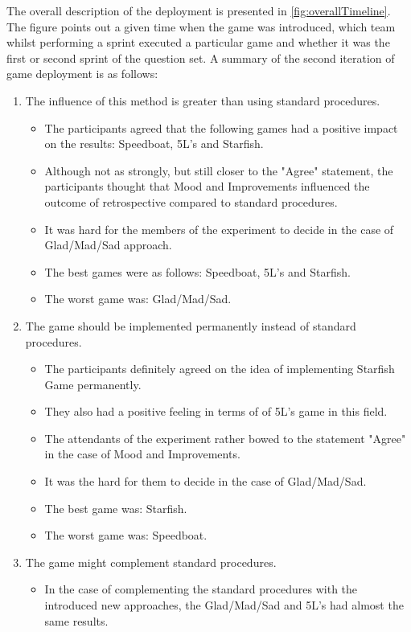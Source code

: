 The overall description of the deployment is presented in \autoref{fig:overallTimeline}. The figure points out a given time when the game was introduced, which team whilst performing a sprint executed a particular game and whether it was the first or second sprint of the question set. A summary of the second iteration of game deployment is as follows:
\begin{enumerate}
    \item The influence of this method is greater than using standard procedures.
    \begin{itemize}
        \item The participants agreed that the following games had a positive impact on the results: Speedboat, 5L's and Starfish.
        \item Although not as strongly, but still closer to the "Agree" statement, the participants thought that Mood and Improvements influenced the outcome of retrospective compared to standard procedures.
        \item It was hard for the members of the experiment to decide in the case of Glad/Mad/Sad approach.
        \item The best games were as follows: Speedboat, 5L's and Starfish.
        \item The worst game was: Glad/Mad/Sad.
    \end{itemize}
    \item The game should be implemented permanently instead of standard procedures.
    \begin{itemize}
        \item The participants definitely agreed on the idea of implementing Starfish Game permanently.
        \item They also had a positive feeling in terms of of 5L's game in this field.
        \item The attendants of the experiment rather bowed to the statement "Agree" in the case of Mood and Improvements.
        \item It was the hard for them to decide in the case of Glad/Mad/Sad.
        \item The best game was: Starfish.
        \item The worst game was: Speedboat.
    \end{itemize}
    \item The game might complement standard procedures.
    \begin{itemize}
        \item In the case of complementing the standard procedures with the introduced new approaches, the Glad/Mad/Sad and 5L's had almost the same results.

\end{itemize}
\end{enumerate}
